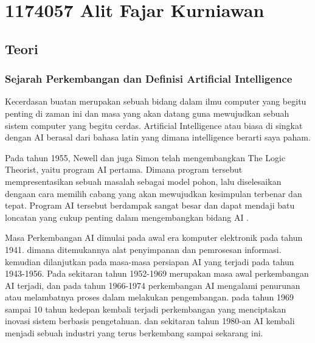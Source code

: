 \section{1174057 Alit Fajar Kurniawan}
\subsection{Teori}
	\subsubsection {Sejarah Perkembangan dan Definisi Artiﬁcial Intelligence}
	\par Kecerdasan buatan merupakan sebuah bidang dalam ilmu computer yang begitu penting di zaman ini dan masa yang akan datang guna mewujudkan sebuah sistem computer yang begitu cerdas. Artiﬁcial Intelligence atau biasa di singkat dengan AI berasal dari bahasa latin yang dimana intelligence berarti saya paham.
	\par Pada tahun 1955, Newell dan juga Simon telah mengembangkan The Logic Theorist, yaitu program AI pertama. Dimana program tersebut mempresentasikan sebuah masalah sebagai model pohon, lalu diselesaikan dengaan cara memilih cabang yang akan mewujudkan kesimpulan terbenar dan tepat. Program AI tersebut berdampak sangat besar dan dapat mendaji batu loncatan yang cukup penting dalam mengembangkan bidang AI \cite{baraja2008kecerdasan}.
	\par
	Masa Perkembangan AI dimulai pada awal era komputer elektronik pada tahun 1941. dimana ditemukannya alat penyimpanan dan pemrosesan informasi. kemudian dilanjutkan pada masa-masa persiapan AI yang terjadi pada tahun 1943-1956. Pada sekitaran tahun 1952-1969 merupakan masa awal perkembangan AI terjadi, dan pada tahun 1966-1974 perkembangan AI mengalami penurunan atau melambatnya proses dalam melakukan pengembangan. pada tahun 1969 sampai 10 tahun kedepan kembali terjadi perkembangan yang menciptakan inovasi sistem berbasis pengetahuan. dan sekitaran tahun 1980-an AI kembali menjadi sebuah industri yang terus berkembang sampai sekarang ini.


